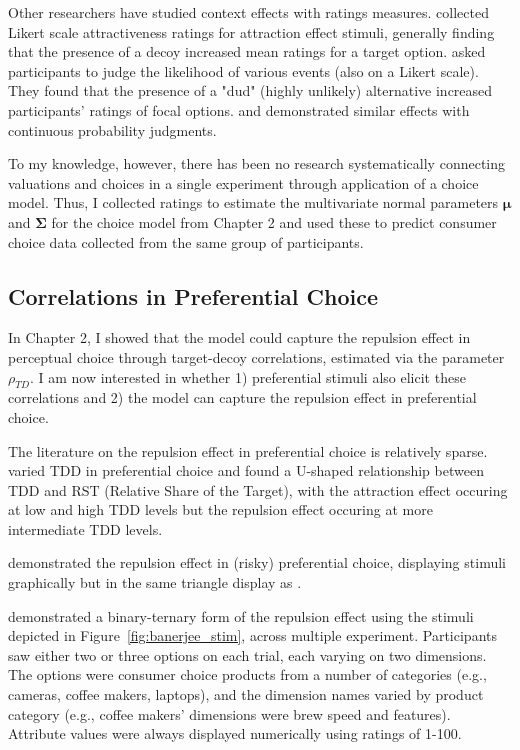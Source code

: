 Other researchers have studied context effects with ratings measures. \textcite{wedellUsingJudgmentsUnderstand} collected Likert scale attractiveness ratings for attraction effect stimuli, generally finding that the presence of a decoy increased mean ratings for a target option. \textcite{windschitl2004dud} asked participants to judge the likelihood of various events (also on a Likert scale). They found that the presence of a "dud" (highly unlikely) alternative increased participants' ratings of focal options. \textcite{caiWhenAlternativeHypotheses2023} and \textcite{fang2024context} demonstrated similar effects with continuous probability judgments.

To my knowledge, however, there has been no research systematically connecting valuations and choices in a single experiment through application of a choice model. Thus, I collected ratings to estimate the multivariate normal parameters $\boldsymbol{\mu}$ and $\boldsymbol{\Sigma}$ for the choice model from Chapter 2 and used these to predict consumer choice data collected from the same group of participants.

\subsection{Correlations in Preferential Choice}
In Chapter 2, I showed that the model could capture the repulsion effect in perceptual choice \parencite{spektorWhenGoodLooks2018b} through target-decoy correlations, estimated via the parameter $\rho_{TD}$. I am now interested in whether 1) preferential stimuli also elicit these correlations and 2) the model can capture the repulsion effect in preferential choice. 

The literature on the repulsion effect in preferential choice is relatively sparse. \textcite{liaoInfluenceDistanceDecoy2021} varied TDD in preferential choice and found a U-shaped relationship between TDD and RST (Relative Share of the Target), with the attraction effect occuring at low and high TDD levels but the repulsion effect occuring at more intermediate TDD levels. 

\textcite{spektorRepulsionEffectPreferential2022} demonstrated the repulsion effect in (risky) preferential choice, displaying stimuli graphically but in the same triangle display as \textcite{spektorWhenGoodLooks2018b}.

\textcite{banerjeeFactorsThatPromote2024} demonstrated a binary-ternary form of the repulsion effect using the stimuli depicted in Figure~\ref{fig:banerjee_stim}, across multiple experiment. Participants saw either two or three options on each trial, each varying on two dimensions. The options were consumer choice products from a number of categories (e.g., cameras, coffee makers, laptops), and the dimension names varied by product category (e.g., coffee makers' dimensions were brew speed and features). Attribute values were always displayed numerically using ratings of 1-100.

